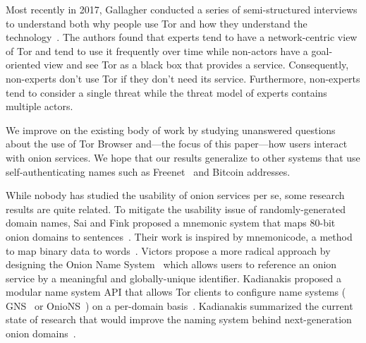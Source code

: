 Most recently in 2017, Gallagher \ea conducted a series of semi-structured
interviews to understand both why people use Tor and how they understand the
technology~\cite{Gallagher2017a}.  The authors found that experts tend to have a
network-centric view of Tor and tend to use it frequently over time while
non-actors have a goal-oriented view and see Tor as a black box that provides a
service.  Consequently, non-experts don't use Tor if they don't need its
service.  Furthermore, non-experts tend to consider a single threat while the
threat model of experts contains multiple actors.

We improve on the existing body of work by studying unanswered questions about
the use of Tor Browser and---the focus of this paper---how users interact with
onion services.  We hope that our results generalize to other systems that use
self-authenticating names such as Freenet~\cite{Freenet} and Bitcoin addresses.

While nobody has studied the usability of onion services per se, some research
results are quite related.  To mitigate the usability issue of
randomly-generated domain names, Sai and Fink proposed a mnemonic system that
maps 80-bit onion domains to sentences~\cite{Sai2012a}.  Their work is inspired
by mnemonicode, a method to map binary data to words~\cite{mnemonicode}.
Victors \ea propose a more radical approach by designing the Onion Name
System~\cite{Victors2017a} which allows users to reference an onion service by a
meaningful and globally-unique identifier.  Kadianakis \ea proposed a modular
name system API that allows Tor clients to configure name systems (\eg
GNS~\cite{Schanzenbach2012a} or OnioNS~\cite{Victors2017a}) on a per-domain
basis~\cite{Kadianakis2016a}.  Kadianakis summarized the current state of
research that would improve the naming system behind next-generation onion
domains~\cite{Kadianakis2017a}.
